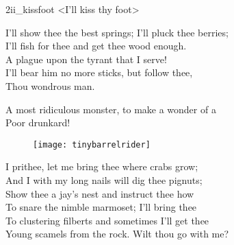






\begin{pictures} %
	\begin{a4}
		\begin{colorbigpic}
			[1]
			{2ii_kissfoot}
			{<I'll kiss thy foot>}
		\end{colorbigpic}
	\end{a4}
\end{pictures}

\begin{verse_speech}[Caliban] 
I'll show thee the best springs; I'll pluck thee berries;\\
I'll fish for thee and get thee wood enough.\\
A plague upon the tyrant that I serve!\\
I'll bear him no more sticks, but follow thee,\\
Thou wondrous man.
\end{verse_speech}

\begin{verse_speech}[Trinculo]
A most ridiculous monster, to make a wonder of a\\
Poor drunkard!
\end{verse_speech}


\begin{a4}
	\begin{figure}[tb]
		\centering
		\texttt{[image: tinybarrelrider]}
	\end{figure}
\end{a4}


\begin{verse_speech}[Caliban] 
I prithee, let me bring thee where crabs grow;\\
And I with my long nails will dig thee pignuts;\\
Show thee a jay's nest and instruct thee how\\
To snare the nimble marmoset; I'll bring thee\\
To clustering filberts and sometimes I'll get thee\\
Young scamels from the rock. Wilt thou go with me?
\end{verse_speech}

